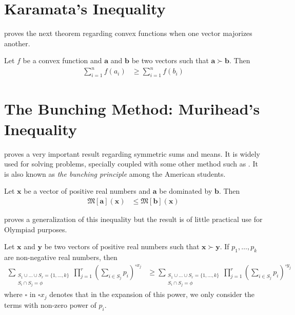 \documentclass[inequalities.tex]{subfile}
\begin{document}
	\section[Karamata]{Karamata's Inequality}\label{sec:karamata}
	\textcite{karamata_1932} proves the next theorem regarding convex functions when one vector majorizes another.
		\begin{theorem}
			Let $f$ be a convex function and $\mathbf{a}$ and $\mathbf{b}$ be two vectors such that $\mathbf{a}\succ\mathbf{b}$. Then
				\begin{align*}
					\sum_{i=1}^{n}f(a_{i})
						& \geq \sum_{i=1}^{n}f(b_{i})
				\end{align*}
		\end{theorem}
	\section[Bunching: Muirhead]{The Bunching Method: Murihead's Inequality}\label{sec:bunching}
	
	\textcite{muirhead_1902} proves a very important result regarding symmetric sums and means. It is widely used for solving problems, specially coupled with some other method such as . It is also known as \textit{the bunching principle} among the American students.
		\begin{theorem}\label{thm:muirhead}
			Let $\mathbf{x}$ be a vector of positive real numbers and $\mathbf{a}$ be dominated by $\mathbf{b}$. Then
				\begin{align*}
					\mathfrak{M}[\mathbf{a}](\mathbf{x})
						& \leq \mathfrak{M}[\mathbf{b}](\mathbf{x})
				\end{align*}
		\end{theorem}
	\textcite{paris_vencovska_2009} proves a generalization of this inequality but the result is of little practical use for Olympiad purposes.
		\begin{theorem}
			Let $\mathbf{x}$ and $\mathbf{y}$ be two vectors of positive real numbers such that $\mathbf{x}\succ\mathbf{y}$. If $p_{1},\ldots,p_{k}$ are non-negative real numbers, then
				\begin{align*}
					\sum_{\substack{S_{1}\cup\ldots\cup S_{r}=\{1,\ldots,k\}\\S_{i}\cap S_{j}=\phi}}\prod_{j=1}^{r}\left(\sum_{i\in S_{j}}p_{i}\right)^{\square x_{j}}
						& \geq \sum_{\substack{S_{1}\cup\ldots\cup S_{r}=\{1,\ldots,k\}\\S_{i}\cap S_{j}=\phi}}\prod_{j=1}^{r}\left(\sum_{i\in S_{j}}p_{i}\right)^{\square y_{j}}
				\end{align*}
			where $\square$ in $\square x_{j}$ denotes that in the expansion of this power, we only consider the terms with non-zero power of $p_{i}$.
		\end{theorem}
	
\end{document}

